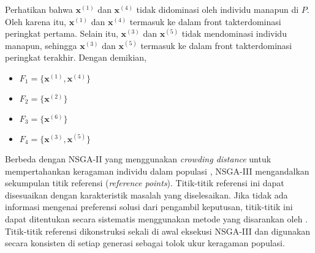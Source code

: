 Perhatikan bahwa $\mathbf{x}^{(1)}$ dan $\mathbf{x}^{(4)}$ tidak didominasi oleh individu manapun di $P$. Oleh karena itu, $\mathbf{x}^{(1)}$ dan $\mathbf{x}^{(4)}$ termasuk ke dalam front takterdominasi peringkat pertama. Selain itu, $\mathbf{x}^{(3)}$ dan $\mathbf{x}^{(5)}$ tidak mendominasi individu manapun, sehingga $\mathbf{x}^{(3)}$ dan $\mathbf{x}^{(5)}$ termasuk ke dalam front takterdominasi peringkat terakhir. Dengan demikian,

\begin{itemize}  
  \item $F_1 = \{\mathbf{x}^{(1)}, \mathbf{x}^{(4)}\}$
  \item $F_2 = \{\mathbf{x}^{(2)}\}$
  \item $F_3 = \{\mathbf{x}^{(6)}\}$
  \item $F_4 = \{\mathbf{x}^{(3)}, \mathbf{x}^{(5)}\}$
\end{itemize}

Berbeda dengan NSGA-II yang menggunakan \textit{crowding distance} untuk mempertahankan keragaman individu dalam populasi \citep{Deb2002}, NSGA-III mengandalkan sekumpulan titik referensi (\textit{reference points}). Titik-titik referensi ini dapat disesuaikan dengan karakteristik masalah yang diselesaikan. Jika tidak ada informasi mengenai preferensi solusi dari pengambil keputusan, titik-titik ini dapat ditentukan secara sistematis menggunakan metode yang disarankan oleh \citet{DasDennis1998}. Titik-titik referensi dikonstruksi sekali di awal eksekusi NSGA-III dan digunakan secara konsisten di setiap generasi sebagai tolok ukur keragaman populasi.
